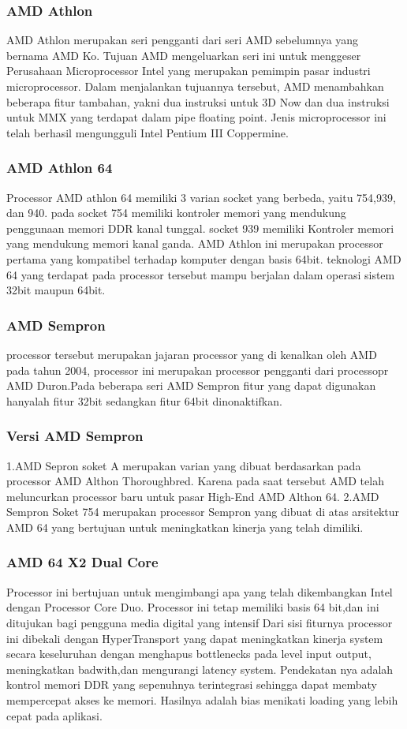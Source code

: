  			\subsubsection{AMD Athlon}
 	AMD Athlon merupakan seri pengganti dari seri AMD sebelumnya yang bernama AMD Ko. Tujuan AMD mengeluarkan seri ini untuk menggeser Perusahaan Microprocessor Intel yang merupakan pemimpin pasar industri microprocessor. Dalam menjalankan tujuannya tersebut, AMD menambahkan beberapa fitur tambahan, yakni dua instruksi untuk 3D Now dan dua instruksi untuk MMX yang terdapat dalam pipe floating point. Jenis microprocessor ini telah berhasil mengungguli Intel Pentium III Coppermine.


 			\subsubsection{AMD Athlon 64}
 	Processor AMD athlon 64 memiliki 3 varian socket yang berbeda, yaitu 754,939, dan 940. pada socket 754 memiliki kontroler memori yang mendukung penggunaan memori DDR kanal tunggal. socket 939 memiliki Kontroler memori yang mendukung memori kanal ganda. AMD Athlon ini merupakan processor pertama yang kompatibel terhadap komputer dengan basis 64bit.  teknologi AMD 64 yang terdapat pada processor tersebut mampu berjalan dalam operasi sistem 32bit maupun 64bit.


 			\subsubsection {AMD Sempron}
 	processor tersebut merupakan jajaran processor yang di kenalkan oleh AMD pada tahun 2004, processor ini merupakan processor pengganti dari processopr AMD Duron.Pada beberapa seri AMD Sempron fitur yang dapat digunakan hanyalah fitur 32bit sedangkan fitur 64bit dinonaktifkan.
 			\subsubsection {Versi AMD Sempron}
 	 1.AMD Sepron soket A merupakan varian yang dibuat berdasarkan pada processor AMD Althon Thoroughbred. Karena pada saat tersebut AMD telah meluncurkan processor baru untuk pasar High-End AMD Althon 64.
 	 2.AMD Sempron Soket 754 merupakan processor Sempron yang dibuat di atas arsitektur AMD 64 yang bertujuan untuk meningkatkan kinerja yang telah dimiliki.


			\subsubsection{AMD 64 X2 Dual Core}
 	Processor ini bertujuan untuk mengimbangi apa yang telah dikembangkan Intel dengan Processor Core Duo. Processor ini tetap memiliki basis 64 bit,dan ini ditujukan bagi pengguna media digital yang intensif
 	Dari sisi fiturnya processor ini dibekali dengan HyperTransport yang dapat meningkatkan kinerja system secara keseluruhan dengan menghapus bottlenecks pada level input output, meningkatkan badwith,dan mengurangi latency system. Pendekatan nya adalah kontrol memori DDR yang sepenuhnya terintegrasi sehingga dapat membaty mempercepat akses ke memori. Hasilnya adalah bias menikati loading yang lebih cepat pada aplikasi.


